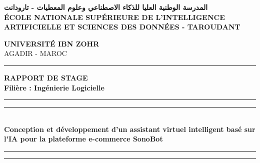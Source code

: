 \documentclass[12pt, a4paper, oneside]{report}
\begin{document}
\begin{titlepage}
  \clearpage
  \thispagestyle{empty}
  \begin{center}

    \begin{minipage}{0.65\textwidth}
      \begin{center}
        {\small\bfseries المدرسة الوطنية العليا للذكاء الاصطناعي وعلوم المعطيات - تارودانت}\\[3pt]
        {\tiny\bfseries ÉCOLE NATIONALE SUPÉRIEURE DE L'INTELLIGENCE ARTIFICIELLE ET SCIENCES DES DONNÉES - TAROUDANT}
      \end{center}
    \end{minipage}
    \hfill
    \begin{minipage}{0.28\textwidth}
      \begin{center}
        \textbf{UNIVERSITÉ IBN ZOHR}\\
        {\scriptsize AGADIR - MAROC}
      \end{center}
    \end{minipage}

    \vspace{12pt}
    {\color{mainblue}\rule{\textwidth}{6pt}}

    \vspace{35pt}

    {\Huge \textbf{RAPPORT DE STAGE}}\\[15pt]
    {\Large \textbf{Filière : Ingénierie Logicielle}}\\[30pt]

    {\color{mainblue}\rule{\textwidth}{1.5pt}}
    \vspace{2pt}
    {\color{mainblue}\rule{\textwidth}{0.5pt}}\\[10pt]
    {\Large \bfseries Conception et développement d’un assistant virtuel intelligent basé sur l'IA pour la plateforme e-commerce SonoBot}\\[10pt]
    {\color{mainblue}\rule{\textwidth}{0.5pt}}
    \vspace{2pt}
    {\color{mainblue}\rule{\textwidth}{1.5pt}}\\[25pt]


\end{center}
\end{titlepage}
\end{document}
